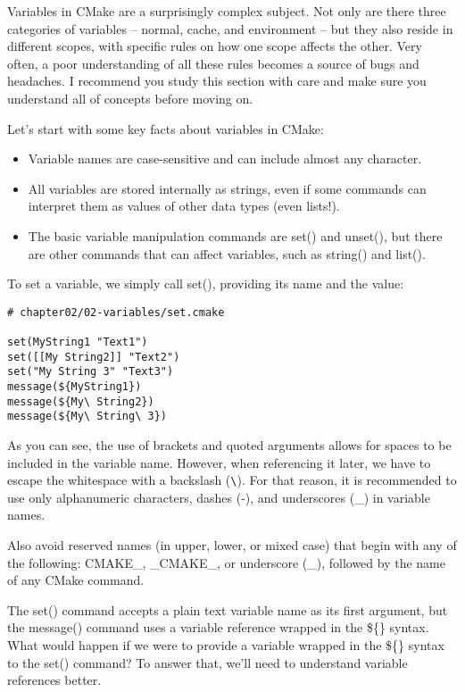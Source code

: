 
Variables in CMake are a surprisingly complex subject. Not only are there three categories of variables – normal, cache, and environment – but they also reside in different scopes, with specific rules on how one scope affects the other. Very often, a poor understanding of all these rules becomes a source of bugs and headaches. I recommend you study this section with care and make sure you understand all of concepts before moving on.

Let's start with some key facts about variables in CMake:

\begin{itemize}
\item 
Variable names are case-sensitive and can include almost any character.

\item 
All variables are stored internally as strings, even if some commands can interpret them as values of other data types (even lists!).

\item 
The basic variable manipulation commands are set() and unset(), but there are other commands that can affect variables, such as string() and list().
\end{itemize}

To set a variable, we simply call set(), providing its name and the value:

\begin{lstlisting}[style=styleCMake]
# chapter02/02-variables/set.cmake

set(MyString1 "Text1")
set([[My String2]] "Text2")
set("My String 3" "Text3")
message(${MyString1})
message(${My\ String2})
message(${My\ String\ 3})
\end{lstlisting}

As you can see, the use of brackets and quoted arguments allows for spaces to be included in the variable name. However, when referencing it later, we have to escape the whitespace with a backslash (\verb|\|). For that reason, it is recommended to use only alphanumeric characters, dashes (-), and underscores (\_) in variable names.

Also avoid reserved names (in upper, lower, or mixed case) that begin with any of the following: CMAKE\_, \_CMAKE\_, or underscore (\_), followed by the name of any CMake command.

\begin{tcolorbox}[colback=blue!5!white,colframe=blue!75!black,title=Note]
The set() command accepts a plain text variable name as its first argument, but the message() command uses a variable reference wrapped in the \$\{\} syntax. What would happen if we were to provide a variable wrapped in the \$\{\} syntax to the set() command? To answer that, we'll need to understand variable references better.
\end{tcolorbox}

